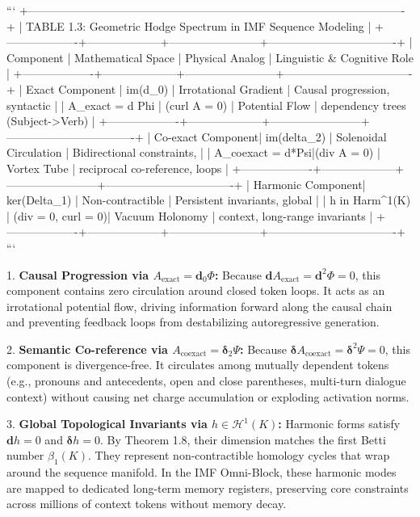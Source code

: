 \documentclass[11pt,twoside,openright]{amsbook}
\begin{document}
{{{{{{```
+----------------------------------------------------------------------------------------------------+
| TABLE 1.3: Geometric Hodge Spectrum in IMF Sequence Modeling                                      |
+-------------------+--------------------+------------------------+----------------------------------+
| Component         | Mathematical Space | Physical Analog        | Linguistic & Cognitive Role      |
+-------------------+--------------------+------------------------+----------------------------------+
| Exact Component   | im(d_0)            | Irrotational Gradient  | Causal progression, syntactic    |
| A_{exact} = d Phi | (curl A = 0)       | Potential Flow         | dependency trees (Subject->Verb) |
+-------------------+--------------------+------------------------+----------------------------------+
| Co-exact Component| im(delta_2)        | Solenoidal Circulation | Bidirectional constraints,       |
| A_{coexact} = d*Psi|(div A = 0)        | Vortex Tube            | reciprocal co-reference, loops   |
+-------------------+--------------------+------------------------+----------------------------------+
| Harmonic Component| ker(Delta_1)       | Non-contractible       | Persistent invariants, global    |
| h in Harm^1(K)    | (div = 0, curl = 0)| Vacuum Holonomy        | context, long-range invariants   |
+-------------------+--------------------+------------------------+----------------------------------+
```

1. \textbf{Causal Progression via $A_{\text{exact}} = \mathbf{d}_0 \Phi$:}  
   Because $\mathbf{d} A_{\text{exact}} = \mathbf{d}^2 \Phi = 0$, this component contains zero circulation around closed token loops. It acts as an irrotational potential flow, driving information forward along the causal chain and preventing feedback loops from destabilizing autoregressive generation.

2. \textbf{Semantic Co-reference via $A_{\text{coexact}} = \boldsymbol{\delta}_2 \Psi$:}  
   Because $\boldsymbol{\delta} A_{\text{coexact}} = \boldsymbol{\delta}^2 \Psi = 0$, this component is divergence-free. It circulates among mutually dependent tokens (e.g., pronouns and antecedents, open and close parentheses, multi-turn dialogue context) without causing net charge accumulation or exploding activation norms.

3. \textbf{Global Topological Invariants via $h \in \mathcal{H}^1(K)$:}  
   Harmonic forms satisfy $\mathbf{d} h = 0$ and $\boldsymbol{\delta} h = 0$. By Theorem 1.8, their dimension matches the first Betti number $\beta_1(K)$. They represent non-contractible homology cycles that wrap around the sequence manifold. In the IMF Omni-Block, these harmonic modes are mapped to dedicated long-term memory registers, preserving core constraints across millions of context tokens without memory decay.

}}}}}}
\end{document}
